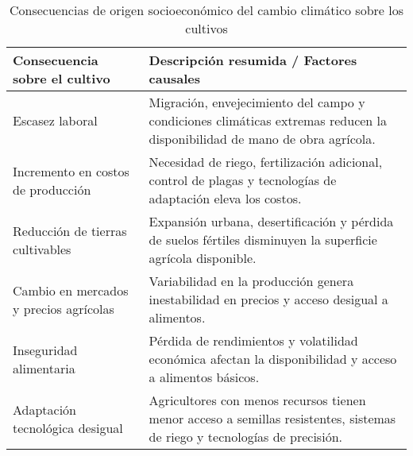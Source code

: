 \begin{table}[ht]
	\centering
	\caption{Consecuencias de origen socioeconómico del cambio climático sobre los cultivos}
	\begin{tabularx}{\textwidth}{|l|X|}
		\hline
		\textbf{Consecuencia sobre el cultivo} & \textbf{Descripción resumida / Factores causales} \\ \hline
		Escasez laboral & Migración, envejecimiento del campo y condiciones climáticas extremas reducen la disponibilidad de mano de obra agrícola. \\ \hline
		Incremento en costos de producción & Necesidad de riego, fertilización adicional, control de plagas y tecnologías de adaptación eleva los costos. \\ \hline
		Reducción de tierras cultivables & Expansión urbana, desertificación y pérdida de suelos fértiles disminuyen la superficie agrícola disponible. \\ \hline
		Cambio en mercados y precios agrícolas & Variabilidad en la producción genera inestabilidad en precios y acceso desigual a alimentos. \\ \hline
		Inseguridad alimentaria & Pérdida de rendimientos y volatilidad económica afectan la disponibilidad y acceso a alimentos básicos. \\ \hline
		Adaptación tecnológica desigual & Agricultores con menos recursos tienen menor acceso a semillas resistentes, sistemas de riego y tecnologías de precisión. \\ \hline
	\end{tabularx}
\end{table}
